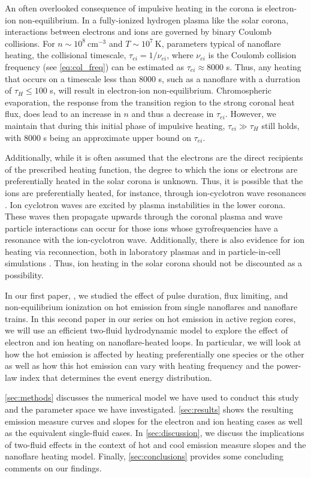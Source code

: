 \documentclass[apj]{emulateapj}
\begin{document}
	\par An often overlooked consequence of impulsive heating in the corona is electron-ion non-equilibrium. In a fully-ionized hydrogen plasma like the solar corona, interactions between electrons and ions are governed by binary Coulomb collisions. For $n\sim10^8~\mathrm{cm}^{-3}$ and $T\sim10^7~\mathrm{K}$, parameters typical of nanoflare heating, the collisional timescale, $\tau_{ei}=1/\nu_{ei}$, where $\nu_{ei}$ is the Coulomb collision frequency (see \autoref{eq:col_freq}) can be estimated as $\tau_{ei}\approx8000$ s. Thus, any heating that occurs on a timescale less than 8000 s, such as a nanoflare with a durration of $\tau_H\le100$ s, will result in electron-ion non-equilibrium. Chromospheric evaporation, the response from the transition region to the strong coronal heat flux, does lead to an increase in $n$ and thus a decrease in $\tau_{ei}$. However, we maintain that during this initial phase of impulsive heating, $\tau_{ei}\gg\tau_H$ still holds, with 8000 s being an approximate upper bound on $\tau_{ei}$. 
	\par Additionally, while it is often assumed that the electrons are the direct recipients of the prescribed heating function, the degree to which the ions or electrons are preferentially heated in the solar corona is unknown. Thus, it is possible that the ions are preferentially heated, for instance, through ion-cyclotron wave resonances \citep{markovskii_intermittent_2004}. Ion cyclotron waves are excited by plasma instabilities in the lower corona. These waves then propagate upwards through the coronal plasma and wave particle interactions can occur for those ions whose gyrofrequencies have a resonance with the ion-cyclotron wave. Additionally, there is also evidence for ion heating via reconnection, both in laboratory plasmas and in particle-in-cell simulations \citep{ono_ion_1996,yoo_bulk_2014,drake_onset_2014}. Thus, ion heating in the solar corona should not be discounted as a possibility.
	\par In our first paper, \citet{cargill_hot_2016} , we studied the effect of pulse duration, flux limiting, and non-equilibrium ionization on hot emission from single nanoflares and nanoflare trains. In this second paper in our series on hot emission in active region cores, we will use an efficient two-fluid hydrodynamic model to explore the effect of electron and ion heating on nanoflare-heated loops. In particular, we will look at how the hot emission is affected by heating preferentially one species or the other as well as how this hot emission can vary with heating frequency and the power-law index that determines the event energy distribution. 
	\par\autoref{sec:methods} discusses the numerical model we have used to conduct this study and the parameter space we have investigated. \autoref{sec:results} shows the resulting emission measure curves and slopes for the electron and ion heating cases as well as the equivalent single-fluid cases. In \autoref{sec:discussion}, we discuss the implications of two-fluid effects in the context of hot and cool emission measure slopes and the nanoflare heating model. Finally, \autoref{sec:conclusions} provides some concluding comments on our findings.
\end{document}
